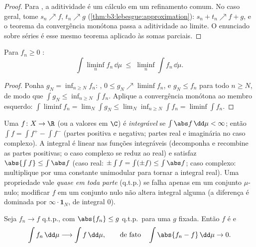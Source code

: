 \begin{proof}
Para , a aditividade é um cálculo em um refinamento
comum. No caso geral, tome $s_n \nearrow f$, $t_n \nearrow g$ (\cref{thm:b3:lebesgue:approximation}): $s_n + t_n \nearrow f +
g$, e o
teorema da convergência monótona passa a aditividade ao limite. O
enunciado sobre séries é esse mesmo teorema aplicado às somas parciais.
\end{proof}

\begin{theorem}\label{thm:b3:lebesgue:fatou}
Para $f_n \geq 0$ :
\[
\int \liminf_n f_n \,\dd\mu \;\leq\; \liminf_n \int
f_n\,\dd\mu .
\]
\end{theorem}

\begin{proof}
Ponha $g_N = \inf_{n\geq N}f_n$: , $0 \leq g_N \nearrow
\liminf f_n$, e $g_N \leq f_n$ para todo $n \geq N$, de modo que
$\int g_N \leq \inf_{n \geq N}\int f_n$. Aplique a convergência monótona ao membro esquerdo: $\int\liminf f_n = \lim_N\int g_N \leq
\lim_N\inf_{n\geq N}\int f_n = \liminf\int f_n$.
\end{proof}

\begin{definition}\label{def:b3:lebesgue:l1}
Uma  $f \colon X \to \R$ (ou a valores em $\C$) é
\emph{integrável} se $\int\abs
f\,\dd\mu < \infty$; então $\int f = \int f^+ - \int f^-$
(partes positiva e negativa; partes real e imaginária no caso
complexo). A integral é linear nas funções integráveis (decomponha e
recombine as partes positivas; o caso complexo se reduz ao real) e
satisfaz $\abs{\int f} \leq
\int\abs f$ (caso real: $\pm\int f = \int(\pm f) \leq
\int\abs f$; caso complexo: multiplique por uma
constante unimodular para tornar a integral real). Uma propriedade vale
\emph{quase em toda parte} (q.t.p.) se falha
apenas em um conjunto $\mu$-nulo; modificar $f$ em um conjunto
nulo não altera integral alguma (a diferença é dominada por $\infty\cdot\mathbf
1_N$, de
integral $0$).
\end{definition}

\begin{theorem}\label{thm:b3:lebesgue:dct}
Seja $f_n \to f$ q.t.p., com $\abs{f_n} \leq g$ q.t.p.\ para uma $g$
\emph{} fixada. Então $f$ é  e
\[
\int f_n\,\dd\mu \longrightarrow \int f\,\dd\mu,
\qquad\text{de fato}\quad \int\abs{f_n - f}\,\dd\mu \to 0 .
\]
\end{theorem}

